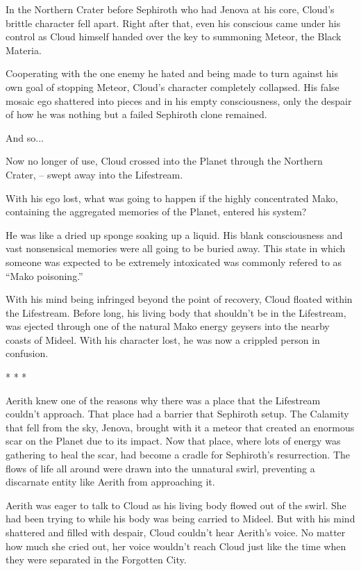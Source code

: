 \documentclass[oneside]{book}
\begin{document}
In the Northern Crater before Sephiroth who had Jenova at his core, Cloud's brittle character fell apart. Right after that, even his conscious came under his control as Cloud himself handed over the key to summoning Meteor, the Black Materia.

Cooperating with the one enemy he hated and being made to turn against his own goal of stopping Meteor, Cloud's character completely collapsed. His false mosaic ego shattered into pieces and in his empty consciousness, only the despair of how he was nothing but a failed Sephiroth clone remained.

And so...

Now no longer of use, Cloud crossed into the Planet through the Northern Crater, – swept away into the Lifestream.

With his ego lost, what was going to happen if the highly concentrated Mako, containing the aggregated memories of the Planet, entered his system?

He was like a dried up sponge soaking up a liquid. His blank consciousness and vast nonsensical memories were all going to be buried away. This state in which someone was expected to be extremely intoxicated was commonly refered to as “Mako poisoning.”

With his mind being infringed beyond the point of recovery, Cloud floated within the Lifestream. Before long, his living body that shouldn't be in the Lifestream, was ejected through one of the natural Mako energy geysers into the nearby coasts of Mideel. With his character lost, he was now a crippled person in confusion.

* * *

Aerith knew one of the reasons why there was a place that the Lifestream couldn't approach. That place had a barrier that Sephiroth setup. The Calamity that fell from the sky, Jenova, brought with it a meteor that created an enormous scar on the Planet due to its impact. Now that place, where lots of energy was gathering to heal the scar, had become a cradle for Sephiroth's resurrection. The flows of life all around were drawn into the unnatural swirl, preventing a discarnate entity like Aerith from approaching it.

Aerith was eager to talk to Cloud as his living body flowed out of the swirl. She had been trying to while his body was being carried to Mideel. But with his mind shattered and filled with despair, Cloud couldn't hear Aerith's voice. No matter how much she cried out, her voice wouldn't reach Cloud just like the time when they were separated in the Forgotten City.
\end{document}
